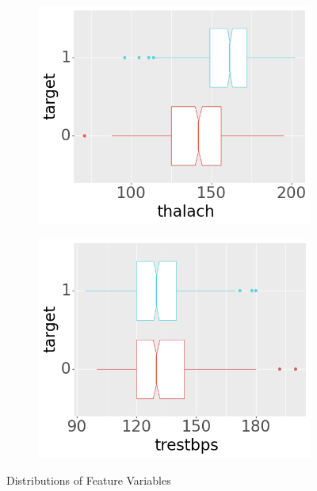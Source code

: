 \begin{figure}[b]
\begin{subfigure}[b]{0.32\textwidth}
         \includegraphics[width=\textwidth]{plots/target-thalach}
     \end{subfigure}

     \begin{subfigure}[b]{0.32\textwidth}
         \centering
         \includegraphics[width=\textwidth]{plots/target-trestbps}
     \end{subfigure}

     \caption[Figure]{Distributions of Feature Variables} \label{fig:subdistributions}
\end{figure}


